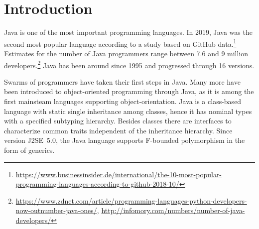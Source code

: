 \section{Introduction}
\label{sec:introduction}

Java is one of the most important programming languages. In 2019, Java
was the second most popular language according to a study
based on GitHub
data.\footnote{\url{https://www.businessinsider.de/international/the-10-most-popular-programming-languages-according-to-github-2018-10/}} Estimates
for the number of Java programmers range between 7.6 and 9 million
developers.\footnote{\url{https://www.zdnet.com/article/programming-languages-python-developers-now-outnumber-java-ones/},
\url{http://infomory.com/numbers/number-of-java-developers/}} Java
has been around since 1995 and progressed through 16 versions.

Swarms of programmers have taken their first steps in Java. Many more
have been introduced to object-oriented programming through Java, as
it is among the first mainsteam languages supporting
object-orientation. Java is a class-based language with static single inheritance among
classes, hence it has nominal types with a specified subtyping
hierarchy. Besides classes there are interfaces to characterize common 
traits independent of the inheritance hierarchy. Since version J2SE~5.0,
the Java language supports F-bounded polymorphism in the form of generics.

